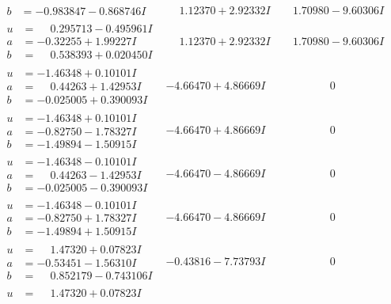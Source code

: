 \documentclass[1p]{elsarticle_modified}
\theoremstyle{definition}
\begin{document}
$$\begin{array}{c|c|c}
\begin{aligned}
b &= -0.983847 - 0.868746 I\end{aligned}
 & \phantom{-}1.12370 + 2.92332 I & \phantom{-}1.70980 - 9.60306 I \\ \hline\begin{aligned}
u &= \phantom{-}0.295713 - 0.495961 I \\
a &= -0.32255 + 1.99227 I \\
b &= \phantom{-}0.538393 + 0.020450 I\end{aligned}
 & \phantom{-}1.12370 + 2.92332 I & \phantom{-}1.70980 - 9.60306 I \\ \hline\begin{aligned}
u &= -1.46348 + 0.10101 I \\
a &= \phantom{-}0.44263 + 1.42953 I \\
b &= -0.025005 + 0.390093 I\end{aligned}
 & -4.66470 + 4.86669 I & \phantom{-0.000000 } 0 \\ \hline\begin{aligned}
u &= -1.46348 + 0.10101 I \\
a &= -0.82750 - 1.78327 I \\
b &= -1.49894 - 1.50915 I\end{aligned}
 & -4.66470 + 4.86669 I & \phantom{-0.000000 } 0 \\ \hline\begin{aligned}
u &= -1.46348 - 0.10101 I \\
a &= \phantom{-}0.44263 - 1.42953 I \\
b &= -0.025005 - 0.390093 I\end{aligned}
 & -4.66470 - 4.86669 I & \phantom{-0.000000 } 0 \\ \hline\begin{aligned}
u &= -1.46348 - 0.10101 I \\
a &= -0.82750 + 1.78327 I \\
b &= -1.49894 + 1.50915 I\end{aligned}
 & -4.66470 - 4.86669 I & \phantom{-0.000000 } 0 \\ \hline\begin{aligned}
u &= \phantom{-}1.47320 + 0.07823 I \\
a &= -0.53451 - 1.56310 I \\
b &= \phantom{-}0.852179 - 0.743106 I\end{aligned}
 & -0.43816 - 7.73793 I & \phantom{-0.000000 } 0 \\ \hline\begin{aligned}
u &= \phantom{-}1.47320 + 0.07823 I \\

\end{aligned}
\end{array}$$
\end{document}
